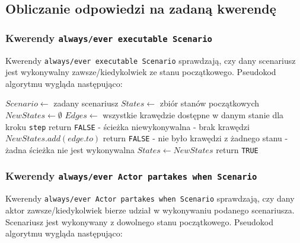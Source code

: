 \documentclass{article}
\begin{document}
\subsection{Obliczanie odpowiedzi na zadaną kwerendę}

\subsubsection{Kwerendy \texttt{always/ever executable Scenario}}

Kwerendy \texttt{always/ever executable Scenario} sprawdzają, czy dany scenariusz jest wykonywalny zawsze/kiedykolwiek ze stanu początkowego. Pseudokod algorytmu wygląda następująco:

\begin{algorithm}[H]
\begin{algorithmic}
\State $Scenario \gets $ zadany scenariusz
\State $States \gets $ zbiór stanów początkowych
    \State $NewStates \gets \emptyset$
        \State $Edges \gets $ wszystkie krawędzie dostępne w danym stanie dla kroku \texttt{step}
        	\State return \texttt{FALSE} - ścieżka niewykonywalna - brak krawędzi
        \EndIf
            \State $NewStates.add(edge.to)$
        \EndFor
    \EndFor
        \State return \texttt{FALSE} - nie było krawędzi z żadnego stanu - żadna ścieżka nie jest wykonywalna
    \EndIf
    \State $States \gets NewStates$
\EndFor
\State return \texttt{TRUE}

\end{algorithmic}
\end{algorithm}

\newpage
\subsubsection{Kwerendy \texttt{always/ever Actor partakes when Scenario}}

Kwerendy \texttt{always/ever Actor partakes when Scenario} sprawdzają, czy dany aktor zawsze/kiedykolwiek bierze udział w wykonywaniu podanego scenariusza. Scenariusz jest wykonywany z dowolnego stanu początkowego. Pseudokod algorytmu wygląda następująco:
\end{document}
